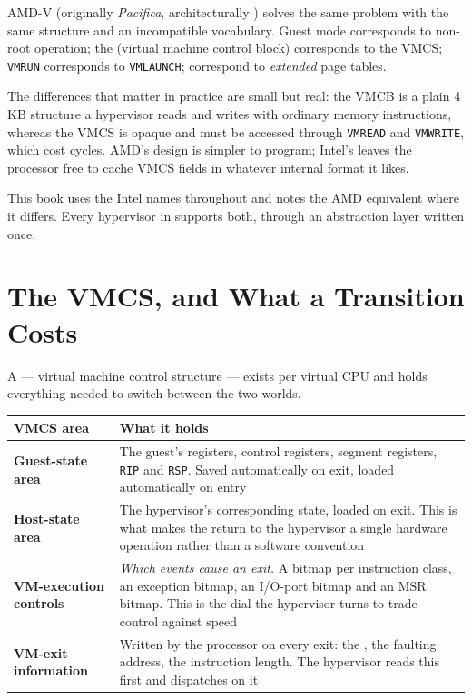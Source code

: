 \begin{conceptbox}
AMD-V (originally \emph{Pacifica}, architecturally ) solves the same
problem with the same structure and an incompatible vocabulary. Guest mode
corresponds to non-root operation; the  (virtual machine control
block) corresponds to the VMCS; \texttt{VMRUN} corresponds to
\texttt{VMLAUNCH};  correspond to \emph{extended} page
tables.

\smallskip
The differences that matter in practice are small but real: the VMCB is a
plain 4 KB structure a hypervisor reads and writes with ordinary memory
instructions, whereas the VMCS is opaque and must be accessed through
\texttt{VMREAD} and \texttt{VMWRITE}, which cost cycles. AMD's design is
simpler to program; Intel's leaves the processor free to cache VMCS fields in
whatever internal format it likes.

\smallskip
This book uses the Intel names throughout and notes the AMD equivalent where it
differs. Every hypervisor in  supports both, through an
abstraction layer written once.
\end{conceptbox}

\section{The VMCS, and What a Transition Costs}

A  --- virtual machine control structure --- exists per virtual CPU
and holds everything needed to switch between the two worlds.

\begin{longtable}{@{}L{3.6cm}L{11.0cm}@{}}
\toprule
{}
\textbf{VMCS area} & \textbf{What it holds} \\
\midrule
\endhead
\textbf{Guest-state area} & The guest's registers, control registers, segment
registers, \texttt{RIP} and \texttt{RSP}. Saved automatically on exit, loaded
automatically on entry \\
\textbf{Host-state area} & The hypervisor's corresponding state, loaded on
exit. This is what makes the return to the hypervisor a single hardware
operation rather than a software convention \\
\textbf{VM-execution controls} & \emph{Which events cause an exit.} A bitmap
per instruction class, an exception bitmap, an I/O-port bitmap and an MSR
bitmap. This is the dial the hypervisor turns to trade control against speed \\
\textbf{VM-exit information} & Written by the processor on every exit: the
, the faulting address, the instruction length. The
hypervisor reads this first and dispatches on it \\
\bottomrule
\end{longtable}

